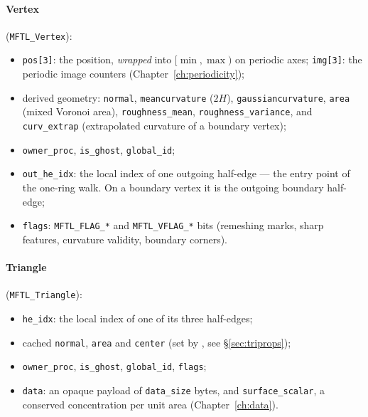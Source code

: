 \paragraph{Vertex} (\texttt{MFTL\_Vertex}):
\begin{itemize}
  \item \texttt{pos[3]}: the position, \emph{wrapped} into $[\min,\max)$ on periodic axes;
    \texttt{img[3]}: the periodic image counters (Chapter~\ref{ch:periodicity});
  \item derived geometry: \texttt{normal}, \texttt{meancurvature} ($2H$),
    \texttt{gaussiancurvature}, \texttt{area} (mixed Voronoi area), \texttt{roughness\_mean},
    \texttt{roughness\_variance}, and \texttt{curv\_extrap} (extrapolated curvature of a
    boundary vertex);
  \item \texttt{owner\_proc}, \texttt{is\_ghost}, \texttt{global\_id};
  \item \texttt{out\_he\_idx}: the local index of one outgoing half-edge --- the entry point of
    the one-ring walk. On a boundary vertex it is the outgoing boundary half-edge;
  \item \texttt{flags}: \texttt{MFTL\_FLAG\_*} and \texttt{MFTL\_VFLAG\_*} bits (remeshing
    marks, sharp features, curvature validity, boundary corners).
\end{itemize}

\paragraph{Triangle} (\texttt{MFTL\_Triangle}):
\begin{itemize}
  \item \texttt{he\_idx}: the local index of one of its three half-edges;
  \item cached \texttt{normal}, \texttt{area} and \texttt{center} (set by
    , see \S\ref{sec:triprops});
  \item \texttt{owner\_proc}, \texttt{is\_ghost}, \texttt{global\_id}, \texttt{flags};
  \item \texttt{data}: an opaque payload of \texttt{data\_size} bytes, and
    \texttt{surface\_scalar}, a conserved concentration per unit area (Chapter~\ref{ch:data}).
\end{itemize}

